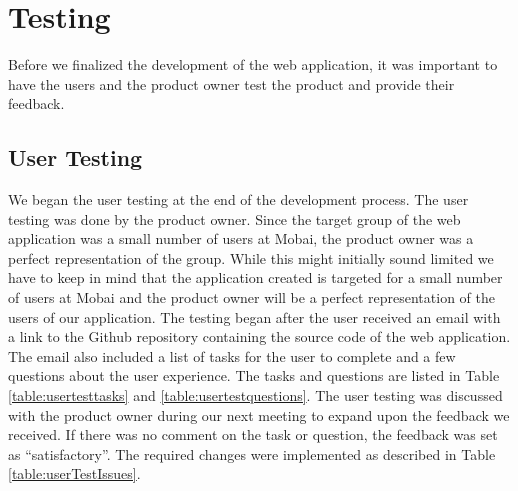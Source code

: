 \section{Testing}
\label{sec:testing}
Before we finalized the development of the web application, it was important to have the users and the product owner test the product and provide their feedback. 

\subsection{User Testing}
We began the user testing at the end of the development process. The user testing was done by the product owner. Since the target group of the web application was a small number of users at Mobai, the product owner was a perfect representation of the group. While this might initially sound limited we have to keep in mind that the application created is targeted for a small number of users at Mobai and the product owner will be a perfect representation of the users of our application. The testing began after the user received an email with a link to the Github repository containing the source code of the web application. The email also included a list of tasks for the user to complete and a few questions about the user experience. The tasks and questions are listed in Table \ref{table:usertesttasks} and \ref{table:usertestquestions}. The user testing was discussed with the product owner during our next meeting to expand upon the feedback we received. If there was no comment on the task or question, the feedback was set as ``satisfactory''. The required changes were implemented as described in Table \ref{table:userTestIssues}.

\begin{table}[h]
\caption{Issues and solutions following the user testing.}
\label{table:userTestIssues}
\end{table}


